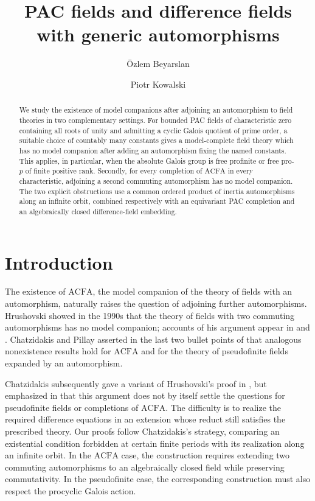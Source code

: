 \documentclass[11pt,a4paper]{amsart}
\title{PAC fields and difference fields with generic automorphisms}
\author[\"{O}.~Beyarslan]{\"{O}zlem Beyarslan}
\author[P.~Kowalski]{Piotr Kowalski}
\date{}
\theoremstyle{definition}
\newcommand{\ACFA}{\mathrm{ACFA}}
\begin{document}
\begin{abstract}
We study the existence of model companions after adjoining an
automorphism to field theories in two complementary settings.
For bounded PAC fields of
characteristic zero containing all roots of unity and admitting a
cyclic Galois quotient of prime order, a suitable choice of countably many constants gives a
model-complete field theory which has no model
companion after adding an automorphism fixing the named constants. This applies, in particular, when the absolute Galois group
is free profinite or free pro-$p$ of finite positive rank. Secondly, for every completion of $\ACFA$ in
every characteristic, adjoining a second commuting automorphism has
no model companion. The two explicit obstructions use a common
ordered product of inertia automorphisms along an infinite orbit,
combined respectively with an equivariant PAC completion and an
algebraically closed difference-field embedding.
\end{abstract}

\maketitle
\tableofcontents

\section{Introduction}\label{sec:introduction}

The existence of $\ACFA$, the model companion of the theory of
fields with an automorphism, naturally raises the question of
adjoining further automorphisms. Hrushovski showed in the 1990s that the theory of fields
with two commuting automorphisms has no model companion;
accounts of his argument appear in
\cite[Section~3]{KikyoSurvey} and
\cite[Section~1.11]{Survey}. 
Chatzidakis and Pillay asserted in the last two bullet points
of \cite[Section~3.11]{CP} that analogous nonexistence results
hold for $\ACFA$ and for the theory of pseudofinite fields
expanded by an automorphism.

Chatzidakis subsequently gave a variant of Hrushovski's proof
in \cite[Section~1.11]{Survey}, but emphasized in
\cite[Remark~1.12]{Survey} that this argument does not by itself
settle the questions for pseudofinite fields or completions of
$\ACFA$. The difficulty is to realize the required difference
equations in an extension whose reduct still satisfies the
prescribed theory. Our proofs follow Chatzidakis's strategy, comparing an
existential condition forbidden at certain finite periods with
its realization along an infinite orbit.
 In the $\ACFA$ case, the construction requires
extending two commuting automorphisms to an algebraically closed
field while preserving commutativity. In the pseudofinite case,
the corresponding construction must also respect the procyclic
Galois action.
\end{document}
